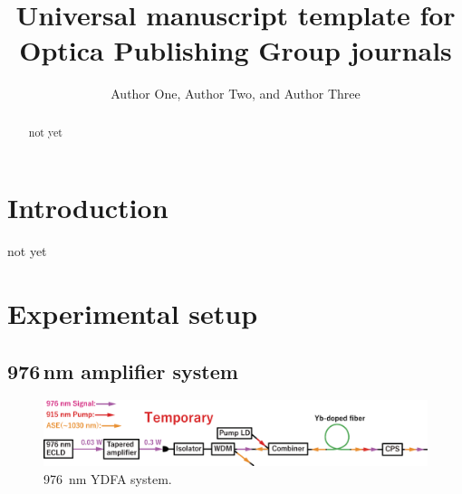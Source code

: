 \documentclass{osa-article}
\begin{document}
\title{Universal manuscript template for Optica Publishing Group journals}

\author{Author One, Author Two, and Author Three}

\address{Reserch Institute for Interdisciplinary Science, Okayama University, Okayama, Japan}




\begin{abstract}
not yet
\end{abstract}

\section{Introduction}
not yet

\section{Experimental setup}
\subsection{976\,nm amplifier system}

\begin{figure}[h!]
  \centering\includegraphics[width=\linewidth]{./Figure/976nmYDFASystem.eps}
  \caption{\SI{976}{\nm} YDFA system.}
  \label{fig:976YDFASystem}
\end{figure}
\end{document}
